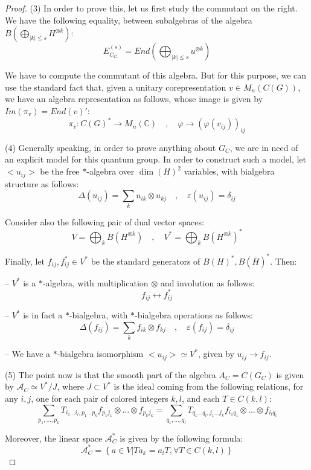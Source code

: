 \documentclass[12pt]{amsbook}
\begin{document}
\begin{proof}
(3) In order to prove this, let us first study the commutant on the right. We have the following equality, between subalgebras of the algebra $B\left(\bigoplus_{|k|\leq s}H^{\otimes k}\right)$:
$$E_{C_G}^{(s)}=End\left(\bigoplus_{|k|\leq s}u^{\otimes k}\right)$$

We have to compute the commutant of this algebra. But for this purpose, we can use the standard fact that, given a unitary corepresentation $v\in M_n(C(G))$, we have an algebra representation as follows, whose image is given by $Im(\pi_v)=End(v)'$:
$$\pi_v:C(G)^*\to M_n(\mathbb C)\quad,\quad 
\varphi\to (\varphi(v_{ij}))_{ij}$$

(4) Generally speaking, in order to prove anything about $G_C$, we are in need of an explicit model for this quantum group. In order to construct such a model, let $<u_{ij}>$ be the free $*$-algebra over $\dim(H)^2$ variables, with bialgebra structure as follows:
$$\Delta(u_{ij})=\sum_ku_{ik}\otimes u_{kj}\quad,\quad 
\varepsilon(u_{ij})=\delta_{ij}$$

Consider also the following pair of dual vector spaces:
$$V=\bigoplus_kB\left(H^{\otimes k}\right)\quad,\quad 
V^*=\bigoplus_kB\left(H^{\otimes k}\right)^*$$

Finally, let $f_{ij},f_{ij}^*\in V^*$ be the standard generators of $B(H)^*,B(\bar{H})^*$. Then:

\medskip

-- $V^*$ is a $*$-algebra, with multiplication $\otimes$ and involution as follows:
$$f_{ij}\leftrightarrow f_{ij}^*$$

-- $V^*$ is in fact a $*$-bialgebra, with $*$-bialgebra operations as follows:
$$\Delta(f_{ij})=\sum_kf_{ik}\otimes f_{kj}\quad,\quad 
\varepsilon(f_{ij})=\delta_{ij}$$

-- We have a $*$-bialgebra isomorphism $<u_{ij}>\simeq V^*$, given by $u_{ij}\to f_{ij}$.

\medskip

(5) The point now is that the smooth part of the algebra $A_C=C(G_C)$ is given by $\mathcal A_C\simeq V^*/J$, where $J\subset V^*$ is the ideal coming from the following relations, for any $i,j$, one for each pair of colored integers $k,l$, and each $T\in C(k,l)$:
$$\sum_{p_1,\ldots,p_k}T_{i_1\ldots i_l,p_1\ldots p_k}f_{p_1j_1}\otimes\ldots\otimes  f_{p_kj_k}
=\sum_{q_1,\ldots,q_l}T_{q_1\ldots q_l,j_1\ldots j_k}f_{i_1q_1}\otimes\ldots\otimes f_{i_lq_l}$$

Moreover, the linear space $\mathcal A_C^*$ is given by the following formula:
$$\mathcal A_C^*=\left\{a\in V\Big|Ta_k=a_lT,\forall T\in C(k,l)\right\}$$


\end{proof}
\end{document}
